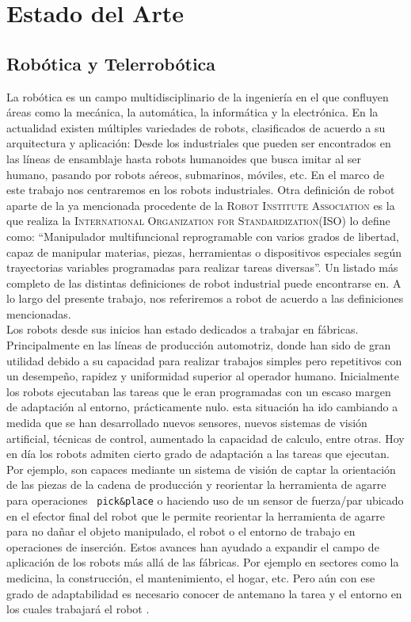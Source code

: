 \chapter{Estado del Arte }
\section{Robótica y Telerrobótica}
La robótica es un campo multidisciplinario de la ingeniería en el que confluyen áreas como la mecánica, la automática, la informática y la electrónica. En la actualidad existen múltiples variedades de robots, clasificados de acuerdo a su arquitectura y aplicación: Desde los industriales que pueden ser encontrados en las líneas de ensamblaje hasta robots humanoides que busca imitar al ser humano, pasando por robots  aéreos, submarinos, móviles, etc. En el marco de este trabajo nos centraremos en los robots industriales. Otra definición de robot aparte de la ya mencionada procedente de la \textsc{Robot Institute Association} es la que realiza la \textsc{International Organization for Standardization}(ISO) lo define como: “Manipulador multifuncional reprogramable con varios grados de libertad, capaz de manipular materias, piezas, herramientas o dispositivos especiales según trayectorias variables programadas para realizar tareas diversas”. Un listado más completo de las distintas definiciones de robot industrial puede encontrarse en\cite{barrientos1997fundamentos}. A lo largo del presente trabajo, nos referiremos a robot de acuerdo a las definiciones mencionadas.\\






Los robots desde sus inicios han estado dedicados a trabajar en fábricas. Principalmente en las líneas de producción automotriz, donde han sido de gran utilidad debido a su capacidad para realizar trabajos simples pero repetitivos con un desempeño, rapidez y uniformidad superior al operador humano. Inicialmente los robots ejecutaban las tareas que le eran programadas con un escaso margen de adaptación al entorno, prácticamente nulo. esta situación   ha ido cambiando a medida que se han desarrollado nuevos sensores, nuevos sistemas de visión artificial, técnicas de control, aumentado la capacidad de calculo, entre otras. Hoy en día los robots admiten cierto grado de adaptación a las tareas que ejecutan. Por ejemplo, son capaces mediante un sistema de visión de captar la orientación de las piezas de la cadena de producción y reorientar la herramienta de agarre para operaciones \texttt{ pick\&place} o haciendo uso de un sensor de fuerza/par ubicado en el efector final del robot que le permite reorientar la herramienta de agarre para no dañar el objeto manipulado, el robot o el entorno de trabajo en operaciones de inserción. Estos avances han ayudado a expandir el campo de aplicación de los robots más allá de las fábricas. Por ejemplo en sectores como la medicina, la construcción, el mantenimiento, el hogar, etc. Pero aún con ese grado de adaptabilidad es necesario conocer de antemano la tarea y el entorno en los cuales trabajar\'a el robot \cite{ott2006humanoid}.\\

